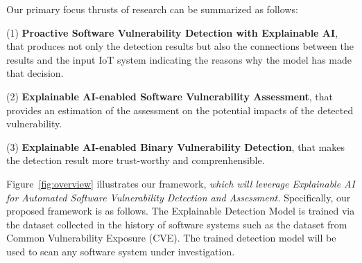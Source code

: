 Our primary focus thrusts of research can be summarized as follows:

(1) {\bf Proactive Software Vulnerability Detection with Explainable
  AI}, that produces not only the detection results but also the
connections between the results and the input IoT system indicating
the reasons why the model has made that decision.
 
(2) {\bf Explainable AI-enabled Software Vulnerability Assessment},
that provides an estimation of the assessment on the potential impacts
of the detected vulnerability.

(3) {\bf Explainable AI-enabled Binary Vulnerability Detection}, that
makes the detection result more trust-worthy and comprenhensible.

Figure~\ref{fig:overview} illustrates our {\tool} framework,
          {\em which will leverage Explainable AI for Automated
            Software Vulnerability Detection and Assessment.}
Specifically, our proposed framework is as follows. The Explainable
Detection Model is trained via the dataset collected in the history of
software systems such as the dataset from Common Vulnerability
Exposure (CVE). The trained detection model will be used to scan any
software system under investigation.
